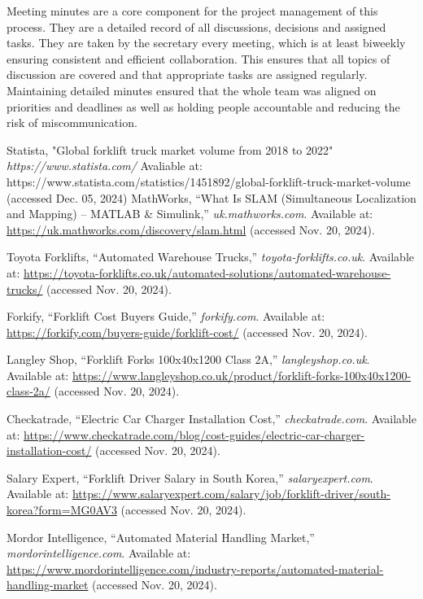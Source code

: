 \documentclass[12pt]{article}
\begin{document}
Meeting minutes are a core component for the project management of this process. They are a detailed record of all discussions, decisions and assigned tasks. They are taken by the secretary every meeting, which is at least biweekly ensuring consistent and efficient collaboration. This ensures that all topics of discussion are covered and that appropriate tasks are assigned regularly. Maintaining detailed minutes ensured that the whole team was aligned on priorities and deadlines as well as holding people accountable and reducing the risk of miscommunication.

\begin{thebibliography}{99}
\footnotesize

Statista, "Global forklift truck market volume from 2018 to 2022"
\textit{https://www.statista.com/}
Avaliable at:
https://www.statista.com/statistics/1451892/global-forklift-truck-market-volume
(accessed Dec. 05, 2024)
MathWorks, “What Is SLAM (Simultaneous Localization and Mapping) – MATLAB \& Simulink,” \textit{uk.mathworks.com}.  
Available at: \url{https://uk.mathworks.com/discovery/slam.html} (accessed Nov. 20, 2024).
 

Toyota Forklifts, “Automated Warehouse Trucks,” \textit{toyota-forklifts.co.uk}.  
Available at: \url{https://toyota-forklifts.co.uk/automated-solutions/automated-warehouse-trucks/} (accessed Nov. 20, 2024).

Forkify, “Forklift Cost Buyers Guide,” \textit{forkify.com}.  
Available at: \url{https://forkify.com/buyers-guide/forklift-cost/} (accessed Nov. 20, 2024).


Langley Shop, “Forklift Forks 100x40x1200 Class 2A,” \textit{langleyshop.co.uk}.  
Available at: \url{https://www.langleyshop.co.uk/product/forklift-forks-100x40x1200-class-2a/} (accessed Nov. 20, 2024).

Checkatrade, “Electric Car Charger Installation Cost,” \textit{checkatrade.com}.  
Available at: \url{https://www.checkatrade.com/blog/cost-guides/electric-car-charger-installation-cost/} (accessed Nov. 20, 2024).

Salary Expert, “Forklift Driver Salary in South Korea,” \textit{salaryexpert.com}.  
Available at: \url{https://www.salaryexpert.com/salary/job/forklift-driver/south-korea?form=MG0AV3} (accessed Nov. 20, 2024).

Mordor Intelligence, “Automated Material Handling Market,” \textit{mordorintelligence.com}.  
Available at: \url{https://www.mordorintelligence.com/industry-reports/automated-material-handling-market} (accessed Nov. 20, 2024).


\end{thebibliography}
\end{document}

